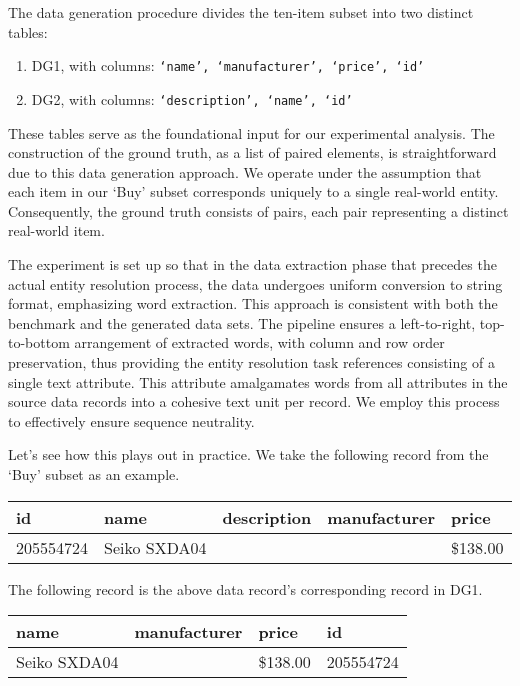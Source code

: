 The data generation procedure divides the ten-item subset into two distinct
tables:

\begin{enumerate}[label=\textbullet,leftmargin=1cm]
\item DG1, with columns: \texttt{`name', `manufacturer', `price', `id'}
\item DG2, with columns: \texttt{`description', `name', `id'}
\end{enumerate}

These tables serve as the foundational input for our experimental analysis.
The construction of the ground truth, as a list of paired elements, is
straightforward due to this data generation approach.
We operate under the assumption that each item in our `Buy' subset
corresponds uniquely to a single real-world entity.
Consequently, the ground truth consists of pairs, each pair representing a
distinct real-world item.

The experiment is set up so that in the data extraction phase that precedes the
actual entity resolution process, the data undergoes uniform conversion to
string format, emphasizing word extraction.
This approach is consistent with both the benchmark and the generated data sets.
The pipeline ensures a left-to-right, top-to-bottom arrangement of extracted
words, with column and row order preservation, thus providing the entity
resolution task references consisting of a single text attribute.
This attribute amalgamates words from all attributes in the source data records
into a cohesive text unit per record.
We employ this process to effectively ensure sequence neutrality.

Let's see how this plays out in practice.
We take the following record from the `Buy' subset as an example.

\begin{table}[ht]
    \setlength\tabcolsep{5pt}
    \begin{tabular}{|l|l|l|l|l|}
        \hline
        id&name&description&manufacturer&price\\
        \hline
        205554724&Seiko SXDA04& & &\$138.00\\
        \hline
    \end{tabular}\label{tab:buy-record}
\end{table}

The following record is the above data record's corresponding record in DG1.

\begin{table}[ht]
    \setlength\tabcolsep{6pt}
    \begin{tabular}{|l|l|l|l|}
        \hline
        name & manufacturer & price & id \\
        \hline
        Seiko SXDA04 & & \$138.00 & 205554724 \\
        \hline
    \end{tabular}\label{tab:dg1-record}
\end{table}

